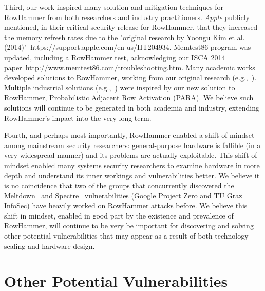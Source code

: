 \documentclass[runningheads]{llncs}
\begin{document}
Third, our work inspired many solution and mitigation techniques for
RowHammer from both researchers and industry practitioners. {\em
  Apple} publicly mentioned, in their critical security release for
RowHammer, that they increased the memory refresh rates due to the
"original research by Yoongu Kim et
al. (2014)"~https://support.apple.com/en-us/HT204934. Memtest86 program was updated, including
a RowHammer test, acknowledging our ISCA 2014
paper~http://www.memtest86.com/troubleshooting.htm. Many academic works developed solutions to
RowHammer, working from our original research
(e.g.,~\cite{anvil,moin-rowhammer,anotherflip,seyedzadeh2017counter,brasser2016can,irazoqui2016mascat,son2017making,gomez2016dram,van2018guardion,lee2018twice}). Multiple
industrial solutions (e.g.,~\cite{x210-github,x210-rh-ss}) were
inspired by our new solution to RowHammer, Probabilistic Adjacent Row
Activation (PARA). We believe such solutions will continue to be generated in both academia and industry, extending RowHammer's impact into the very long term.

Fourth, and perhaps most importantly, RowHammer enabled a shift of
mindset among mainstream security researchers: general-purpose
hardware is fallible (in a very widespread manner) and its problems
are actually exploitable. This shift of mindset enabled many systems
security researchers to examine hardware in more depth and understand
its inner workings and vulnerabilities better. We believe it is no
coincidence that two of the groups that concurrently discovered the
Meltdown~\cite{lipp2018meltdown} and Spectre~\cite{kocher2018spectre}
vulnerabilities (Google Project Zero and TU Graz InfoSec) have heavily
worked on RowHammer attacks before. We believe this shift in mindset,
enabled in good part by the existence and prevalence of RowHammer,
will continue to be very be important for discovering and solving
other potential vulnerabilities that may appear as a result of both
technology scaling and hardware design.


\section{Other Potential Vulnerabilities}
\end{document}
